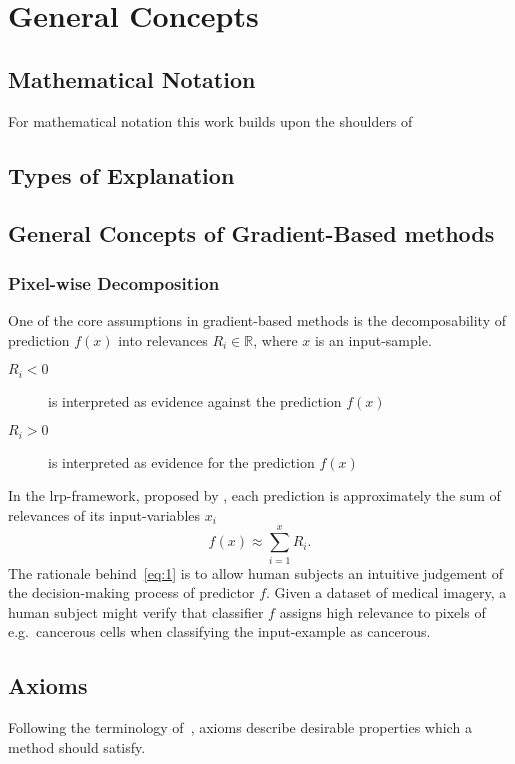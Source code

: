 \section{General Concepts}
\blindtext[3]

\subsection{Mathematical Notation}
For mathematical notation this work builds upon the shoulders of~\cite{Kindermans.2018}
\blindtext[1]
\subsection{Types of Explanation}
\blindtext[3]
\subsection{General Concepts of Gradient-Based methods}
\subsubsection{Pixel-wise Decomposition}
One of the core assumptions in gradient-based methods is the decomposability of prediction \(f(x)\) into relevances \(R_i \in \mathbb R\), where \(x\) is an input-sample. 
\begin{description}
    \item[\(R_i < 0\)] is interpreted as evidence against the prediction \(f(x)\)
    \item[\(R_i > 0\)] is interpreted as evidence for the prediction \(f(x)\)
\end{description}
In the \gls{lrp}-framework, proposed by , each prediction is approximately the sum of relevances of its input-variables \(x_i\)
\begin{equation}
    f(x) \approx \sum_{i=1}^{x} R_i.\label{eq:1}
\end{equation}
The rationale behind~\eqref{eq:1} is to allow human subjects an intuitive judgement of the decision-making process of predictor \(f\). Given a dataset of medical imagery, a human subject might verify that classifier \(f\) assigns high relevance to pixels of e.g.\ cancerous cells when classifying the input-example as cancerous.

\subsection{Axioms}
Following the terminology of~\cite{Sundararajan.2017}, axioms describe desirable properties which a method should satisfy.
